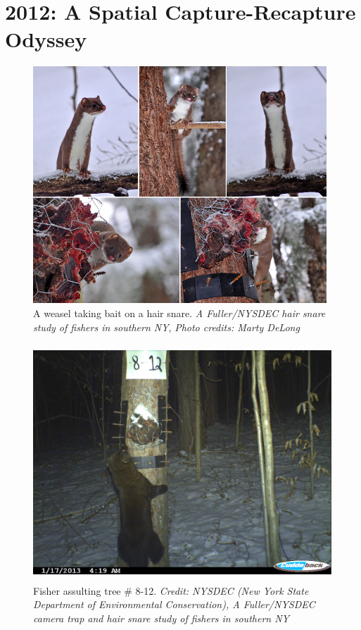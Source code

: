 


\chapter{
 2012: A Spatial Capture-Recapture Odyssey
 }

\label{chapt.final}

\vspace{0.3cm}


\vspace{2in}



\begin{figure}[h!]
\centering
\includegraphics[height=3.5in]{Ch20-Last/Chp20picturearray.jpg}
\caption{
A weasel taking bait on a hair snare.
{\it A Fuller/NYSDEC hair snare study of fishers in
southern NY}, {\it Photo credits: Marty DeLong}
}
\label{last.fig.weasels}
\end{figure}


\begin{figure}[h!]
\centering
\includegraphics[height=3.5in]{Ch20-Last/fisher.jpg}
\caption{
Fisher assulting tree \# 8-12.
{\it Credit: NYSDEC (New York State Department of Environmental Conservation),
A Fuller/NYSDEC camera trap and hair snare study of fishers in
southern NY}
}
\label{last.fig.fisher}
\end{figure}


